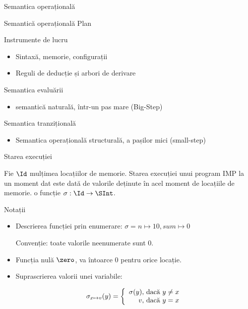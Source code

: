 \documentclass[xcolor=pdftex,romanian,colorlinks]{beamer}
\begin{document}
\begin{section}{Semantica operațională}
\begin{frame}{Semantică operațională}
{Plan}
\begin{itemize}
 \vitem Instrumente de lucru
 \begin{itemize}
  \item Sintaxă, memorie, configurații
  \item Reguli de deducție și arbori de derivare
 \end{itemize}
 \vitem Semantica evaluării
   \begin{itemize}
     \item semantică naturală, într-un pas mare (Big-Step)
	\end{itemize}
 \vitem Semantica tranzițională
	\begin{itemize}
		\item Semantica operațională structurală, a pașilor mici (small-step)
	\end{itemize}
 \end{itemize}
\end{frame}

\begin{frame}{Starea execuției}
\begin{block}{}
Fie $\Id$ mulțimea locațiilor de memorie.
Starea execuției unui program IMP la un moment dat este dată de valorile deținute în acel moment de locațiile de memorie.
 o funcție $\sigma : \Id \rightarrow \SInt$.
\end{block}
\begin{block}{Notații}
\begin{itemize}
\item Descrierea funcției prin enumerare:
$\sigma = n \mapsto 10, sum \mapsto 0$

Convenție: toate valorile neenumerate sunt 0.
\item Funcția nulă $\zero$, va întoarce $0$ pentru orice locație.
\item Suprascrierea valorii unei variabile:

$$\sigma_{x \mapsto v} (y) = \left\{\begin{array}{r@{\mbox{, dacă }}l}
\sigma	(y) & y \neq x \\
v & y = x
\end{array}
\right.$$
\end{itemize}
\end{block}
\end{frame}


\end{section}
\end{document}
